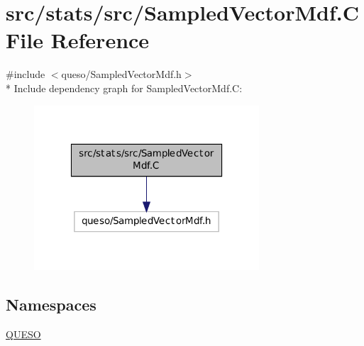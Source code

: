 \hypertarget{_sampled_vector_mdf_8_c}{\section{src/stats/src/\-Sampled\-Vector\-Mdf.C File Reference}
\label{_sampled_vector_mdf_8_c}
}
{\ttfamily \#include $<$queso/\-Sampled\-Vector\-Mdf.\-h$>$}\\*
Include dependency graph for Sampled\-Vector\-Mdf.\-C\-:
\nopagebreak
\begin{figure}[H]
\begin{center}
\leavevmode
\includegraphics[width=238pt]{_sampled_vector_mdf_8_c__incl}
\end{center}
\end{figure}
\subsection*{Namespaces}
\begin{DoxyCompactItemize}
\item 
\hyperlink{namespace_q_u_e_s_o}{Q\-U\-E\-S\-O}
\end{DoxyCompactItemize}

